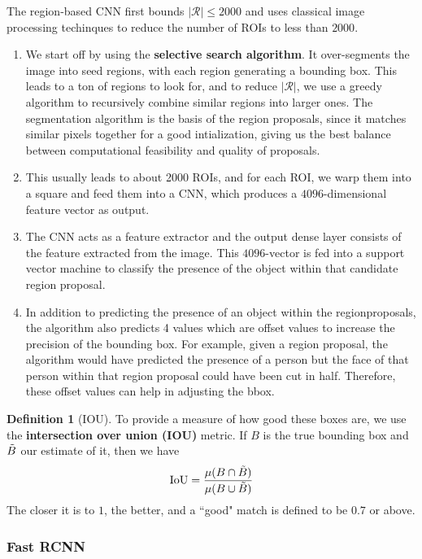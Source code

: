 \documentclass{article}
\theoremstyle{definition}
\theoremstyle{remark}
\theoremstyle{definition}
\newtheorem{definition}{Definition}[section]
\begin{document}
The region-based CNN first bounds $|\mathcal{R}| \leq 2000$ and uses classical image processing techinques to reduce the number of ROIs to less than $2000$. 
\begin{enumerate} 
    \item We start off by using the \textbf{selective search algorithm}. It over-segments the image into seed regions, with each region generating a bounding box. This leads to a ton of regions to look for, and to reduce $|\mathcal{R}|$, we use a greedy algorithm to recursively combine similar regions into larger ones. The segmentation algorithm is the basis of the region proposals, since it matches similar pixels together for a good intialization, giving us the best balance between computational feasibility and quality of proposals. 
    \item This usually leads to about 2000 ROIs, and for each ROI, we warp them into a square and feed them into a CNN, which produces a $4096$-dimensional feature vector as output. 
    \item The CNN acts as a feature extractor and the output dense layer consists of the feature extracted from the image. This $4096$-vector is fed into a support vector machine to classify the presence of the object within that candidate region proposal. 
    \item In addition to predicting the presence of an object within the regionproposals, the algorithm also predicts 4 values which are offset values to increase the precision of the bounding box. For example, given a region proposal, the algorithm would have predicted the presence of a person but the face of that person within that region proposal could have been cut in half. Therefore, these offset values can help in adjusting the bbox.  
\end{enumerate} 


\begin{definition}[IOU]
To provide a measure of how good these boxes are, we use the \textbf{intersection over union (IOU)} metric. If $B$ is the true bounding box and $\Tilde{B}$ our estimate of it, then we have 
\[\mathrm{IoU} = \frac{\mu(B \cap \Tilde{B})}{\mu(B \cup \Tilde{B})}\]
The closer it is to $1$, the better, and a ``good" match is defined to be $0.7$ or above.  
\end{definition} 


\subsubsection{Fast RCNN}
\end{document}
